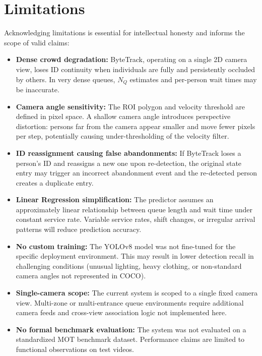 \documentclass[journal, twocolumn]{IEEEtran}
\begin{document}
\section{Limitations}
\label{sec:lim}

Acknowledging limitations is essential for intellectual honesty and informs the scope of valid claims:

\begin{itemize}
    \item \textbf{Dense crowd degradation:} ByteTrack, operating on a single 2D camera view, loses ID continuity when individuals are fully and persistently occluded by others. In very dense queues, $N_Q$ estimates and per-person wait times may be inaccurate.
    \item \textbf{Camera angle sensitivity:} The ROI polygon and velocity threshold are defined in pixel space. A shallow camera angle introduces perspective distortion: persons far from the camera appear smaller and move fewer pixels per step, potentially causing under-thresholding of the velocity filter.
    \item \textbf{ID reassignment causing false abandonments:} If ByteTrack loses a person's ID and reassigns a new one upon re-detection, the original state entry may trigger an incorrect abandonment event and the re-detected person creates a duplicate entry.
    \item \textbf{Linear Regression simplification:} The predictor assumes an approximately linear relationship between queue length and wait time under constant service rate. Variable service rates, shift changes, or irregular arrival patterns will reduce prediction accuracy.
    \item \textbf{No custom training:} The YOLOv8 model was not fine-tuned for the specific deployment environment. This may result in lower detection recall in challenging conditions (unusual lighting, heavy clothing, or non-standard camera angles not represented in COCO).
    \item \textbf{Single-camera scope:} The current system is scoped to a single fixed camera view. Multi-zone or multi-entrance queue environments require additional camera feeds and cross-view association logic not implemented here.
    \item \textbf{No formal benchmark evaluation:} The system was not evaluated on a standardized MOT benchmark dataset. Performance claims are limited to functional observations on test videos.
\end{itemize}
\end{document}
